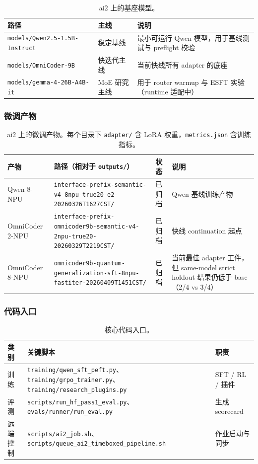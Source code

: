 \documentclass[11pt,a4paper]{article}
\newcommand{\code}[1]{\begingroup\ttfamily\footnotesize\nolinkurl{#1}\endgroup}
\begin{document}
\begin{table}[htbp]
\centering
\small
\begin{tabularx}{\textwidth}{p{3.8cm} p{2.0cm} Y}
\toprule
路径 & 主线 & 说明 \\
\midrule
\code{models/Qwen2.5-1.5B-Instruct} & 稳定基线 & 最小可运行 Qwen 模型，用于基线测试与 preflight 校验 \\
\code{models/OmniCoder-9B} & 快迭代主线 & 当前快线所有 adapter 的底座 \\
\code{models/gemma-4-26B-A4B-it} & MoE 研究主线 & 用于 router warmup 与 ESFT 实验（runtime 适配中） \\
\bottomrule
\end{tabularx}
\caption{ai2 上的基座模型。}
\label{tab:ai2-base-models}
\end{table}

\subsubsection{微调产物}

\begin{table}[htbp]
\centering
\small
\begin{tabularx}{\textwidth}{p{2.0cm} p{4.5cm} p{1.5cm} Y}
\toprule
产物 & 路径（相对于 \code{outputs/}） & 状态 & 说明 \\
\midrule
Qwen 8-NPU & \code{interface-prefix-semantic-v4-8npu-true20-e2-20260326T1627CST/} & 已归档 & Qwen 基线训练产物 \\
OmniCoder 2-NPU & \code{interface-prefix-omnicoder9b-semantic-v4-2npu-true20-20260329T2219CST/} & 已归档 & 快线 continuation 起点 \\
OmniCoder 8-NPU & \code{omnicoder9b-quantum-generalization-sft-8npu-fastiter-20260409T1451CST/} & 已归档 & 当前最佳 adapter 工件，但 same-model strict holdout 结果仍低于 base（2/4 vs 3/4） \\
\bottomrule
\end{tabularx}
\caption{ai2 上的微调产物。每个目录下 \code{adapter/} 含 LoRA 权重，\code{metrics.json} 含训练指标。}
\label{tab:ai2-adapters}
\end{table}

\subsubsection{代码入口}

\begin{table}[htbp]
\centering
\small
\begin{tabularx}{\textwidth}{p{2.0cm} p{5.5cm} Y}
\toprule
类别 & 关键脚本 & 职责 \\
\midrule
训练 & \code{training/qwen\_sft\_peft.py}、\code{training/grpo\_trainer.py}、\code{training/research\_plugins.py} & SFT / RL / 插件 \\
评测 & \code{scripts/run\_hf\_pass1\_eval.py}、\code{evals/runner/run\_eval.py} & 生成 scorecard \\
远端控制 & \code{scripts/ai2\_job.sh}、\code{scripts/queue\_ai2\_timeboxed\_pipeline.sh} & 作业启动与同步 \\
\bottomrule
\end{tabularx}
\caption{核心代码入口。}
\label{tab:code-entries}
\end{table}
\end{document}
